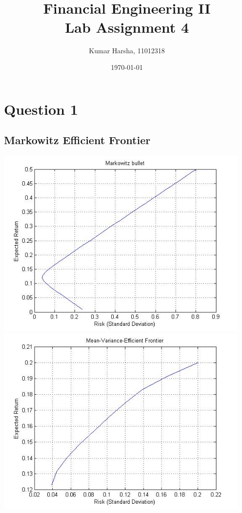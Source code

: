 \documentclass[12pt]{article}
\begin{document}
\title{Financial Engineering II\\Lab Assignment 4}
\author{Kumar Harsha, 11012318}
\date{\today}
\maketitle
\newpage

\section{Question 1}
  \subsection*{Markowitz Efficient Frontier}
  \begin{center}
    \includegraphics[width=5in]{markobullet.jpg}
    \includegraphics[width=5in]{efficientfrontier.jpg}
  \end{center}
  
\end{document}

